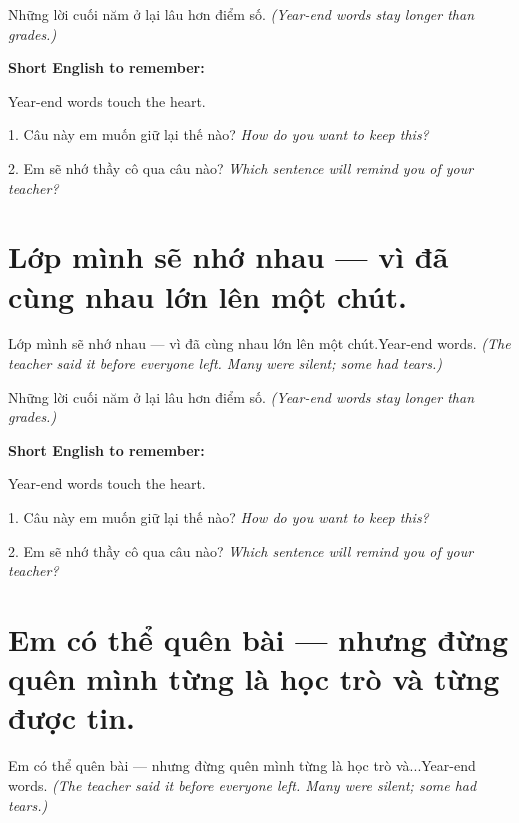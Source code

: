 \begin{baihoc}
Những lời cuối năm ở lại lâu hơn điểm số.
\textit{(Year-end words stay longer than grades.)}
\end{baihoc}

\begin{ghinhoanh}
\textbf{Short English to remember:}

Year-end words touch the heart.

\end{ghinhoanh}

\begin{tuhocnhanh}
1. Câu này em muốn giữ lại thế nào? \textit{How do you want to keep this?}

2. Em sẽ nhớ thầy cô qua câu nào? \textit{Which sentence will remind you of your teacher?}
\end{tuhocnhanh}
\ngancach


\section{Lớp mình sẽ nhớ nhau — vì đã cùng nhau lớn lên một chút.}
\begin{truyen}{Lớp mình sẽ nhớ nhau — vì đã cùng nhau lớn lên một chút.}{Year-end words.}
\textit{(The teacher said it before everyone left. Many were silent; some had tears.)}
\end{truyen}

\begin{baihoc}
Những lời cuối năm ở lại lâu hơn điểm số.
\textit{(Year-end words stay longer than grades.)}
\end{baihoc}

\begin{ghinhoanh}
\textbf{Short English to remember:}

Year-end words touch the heart.

\end{ghinhoanh}

\begin{tuhocnhanh}
1. Câu này em muốn giữ lại thế nào? \textit{How do you want to keep this?}

2. Em sẽ nhớ thầy cô qua câu nào? \textit{Which sentence will remind you of your teacher?}
\end{tuhocnhanh}
\ngancach


\section{Em có thể quên bài — nhưng đừng quên mình từng là học trò và từng được tin.}
\begin{truyen}{Em có thể quên bài — nhưng đừng quên mình từng là học trò và...}{Year-end words.}
\textit{(The teacher said it before everyone left. Many were silent; some had tears.)}
\end{truyen}

